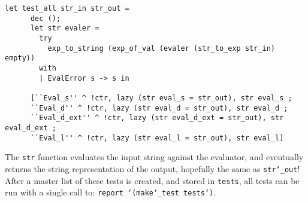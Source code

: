 \documentclass{article}
\begin{document}
\begin{lstlisting}
let test_all str_in str_out =
      dec ();
      let str evaler =
        try
          exp_to_string (exp_of_val (evaler (str_to_exp str_in) empty))
        with
        | EvalError s -> s in

      [``Eval_s'' ^ !ctr, lazy (str eval_s = str_out), str eval_s ;
      ``Eval_d'' ^ !ctr, lazy (str eval_d = str_out), str eval_d ;
      ``Eval_d_ext'' ^ !ctr, lazy (str eval_d_ext = str_out), str eval_d_ext ;
      ``Eval_l'' ^ !ctr, lazy (str eval_l = str_out), str eval_l]
\end{lstlisting}

The \texttt{str} function evaluates the input string against the evaluator, and eventually returns the string representation of the output, hopefully the same as \texttt{str\char`_out}! After a master list of these tests is created, and stored in \texttt{tests}, all tests can be run with a single call to: \texttt{report \char`(make\char`_test tests\char`)}.
\end{document}

